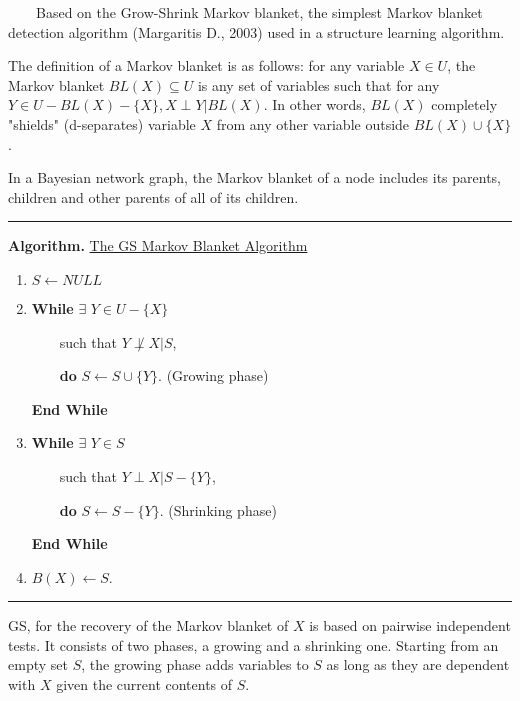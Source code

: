 ~~~~Based on the Grow-Shrink Markov blanket, the simplest Markov blanket detection algorithm (Margaritis D., 2003) used in a structure learning algorithm.

The definition of a Markov blanket is as follows: for any variable $X \in U$, the Markov blanket $BL(X) \subseteq U$ is any set of variables such that for any $Y \in U - BL(X) - \{X\}, X \perp Y | BL(X)$. In other words, $BL(X)$ completely "shields" (d-separates) variable $X$ from any other variable outside $BL(X) \cup \{X\}$.

In a Bayesian network graph, the Markov blanket of a node includes its parents, children and other parents of all of its children.

\begin{center}\rule[0.5ex]{0.9\columnwidth}{1pt}\end{center}

\textbf{Algorithm.} \underline{The GS Markov Blanket Algorithm}

\begin{enumerate}
	\item $S \leftarrow NULL$
	
	\item \textbf{While} $\exists$ $Y\in U-\{X\}$
	
	~~~~such that $Y \not\perp X | S$,
	
	~~~~\textbf{do} $S \leftarrow S \cup \{Y\}$. (Growing phase)
	
	\textbf{End While}
	
	\item \textbf{While} $\exists$ $Y\in S$
	
	~~~~such that $Y \perp X | S - \{Y\}$,
	
	~~~~\textbf{do} $S \leftarrow S - \{Y\}$. (Shrinking phase)
	
	\textbf{End While}
	
	\item $B(X) \leftarrow S$.
\end{enumerate}

\begin{center}\rule[0.5ex]{0.9\columnwidth}{1pt}\end{center}

GS, for the recovery of the Markov blanket of $X$ is based on pairwise independent tests. It consists of two phases, a growing and a shrinking one. Starting from an empty set $S$, the growing phase adds variables to $S$ as long as they are dependent with $X$ given the current contents of $S$.
